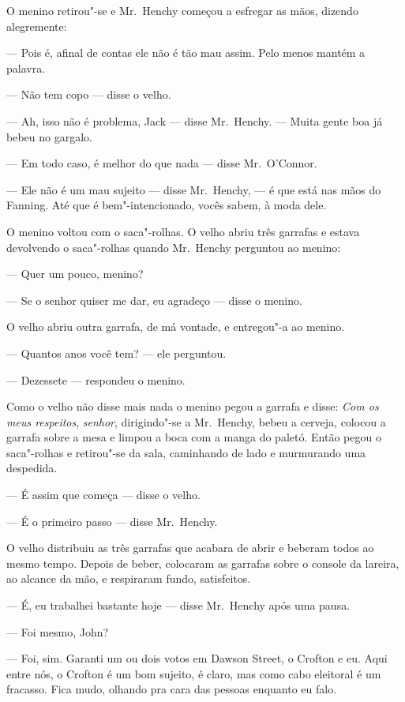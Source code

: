 O menino retirou"-se e Mr.~Henchy começou a esfregar as mãos, dizendo
alegremente:

--- Pois é, afinal de contas ele não é tão mau assim.  Pelo menos mantém a
palavra.

--- Não tem copo --- disse o velho.

--- Ah, isso não é problema, Jack --- disse Mr.~Henchy.  --- Muita gente boa já
bebeu no gargalo.

--- Em todo caso, é melhor do que nada --- disse Mr.~O’Connor.

--- Ele não é um mau sujeito --- disse Mr.~Henchy, --- é que está nas mãos do
Fanning.  Até que é bem"-intencionado, vocês sabem, à moda dele.

O menino voltou com o saca"-rolhas.  O velho abriu três garrafas e estava
devolvendo o saca"-rolhas quando Mr.~Henchy perguntou ao menino:

--- Quer um pouco, menino?

--- Se o senhor quiser me dar, eu agradeço --- disse o menino.

O velho abriu outra garrafa, de má vontade, e entregou"-a ao menino.

--- Quantos anos você tem? --- ele perguntou.

--- Dezessete --- respondeu o menino.

Como o velho não disse mais nada o menino pegou a garrafa e disse: \textit{Com
os meus respeitos}, \textit{senhor}, dirigindo"-se a Mr.~Henchy, bebeu a
cerveja, colocou a garrafa sobre a mesa e limpou a boca com a manga do paletó.
Então pegou o saca"-rolhas e retirou"-se da sala, caminhando de lado e murmurando
uma despedida.

--- É assim que começa --- disse o velho.

--- É o primeiro passo --- disse Mr.~Henchy.

O velho distribuiu as três garrafas que acabara de abrir e beberam todos ao
mesmo tempo.  Depois de beber, colocaram as garrafas sobre o console da
lareira, ao alcance da mão, e respiraram fundo, satisfeitos.

--- É, eu trabalhei bastante hoje --- disse Mr.~Henchy após uma pausa.

--- Foi mesmo, John?

--- Foi, sim.  Garanti um ou dois votos em Dawson Street, o Crofton e eu.  Aqui
entre nós, o Crofton é um bom sujeito, é claro, mas como cabo eleitoral é um
fracasso.  Fica mudo, olhando pra cara das pessoas enquanto eu falo.

